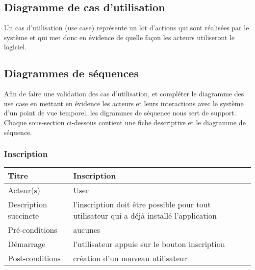 \subsection{Diagramme de cas d'utilisation} %
\label{sub:diagrammes_de_cas_d_utilisation}
Un cas d’utilisation (use case) représente un lot d’actions qui sont réalisées par le système et qui met donc en évidence de quelle façon les acteurs utiliseront le logiciel.

\subsection{Diagrammes de séquences} %
\label{sub:diagrammes_de_séquence}
Afin de faire une validation des cas d'utilisation, et compléter le diagramme des use case en mettant en
évidence les acteurs et leurs interactions avec le système d’un point de vue temporel, les digrammes de séquence nous sert de support.\newline
Chaque sous-section ci-dessous contient une fiche descriptive et le diagramme de séquence.
\subsubsection{Inscription} %
\begin{center}
    \begin{tabular}{ | l | p{10cm} |}
    \hline
    Titre & Inscription \\ \hline
    Acteur(s) & User \\ \hline
    Description succincte & l'inscription doit être possible pour tout utilisateur qui a déjà installé l'application \\ \hline
    Pré-conditions & aucunes \\ \hline
    Démarrage & l'utilisateur appuie sur le bouton inscription \\ \hline
    Post-conditions & création d'un nouveau utilisateur \\ \hline
    \end{tabular}
\end{center}

